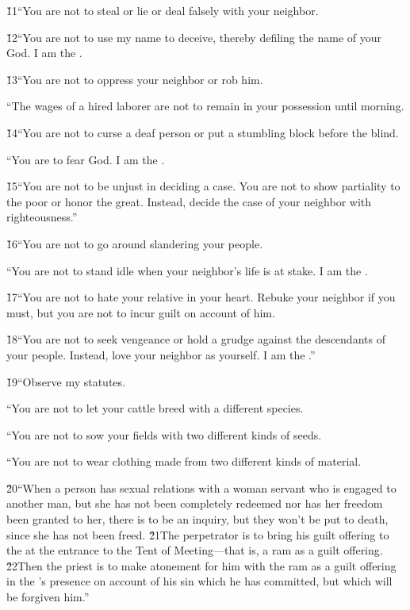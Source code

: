 \v{11}``You are not to steal or lie or deal falsely with your neighbor.

\v{12}``You are not to use my name to deceive, thereby defiling the name of your God. I am the .

\v{13}``You are not to oppress your neighbor or rob him.

``The wages of a hired laborer are not to remain in your possession until morning.

\v{14}``You are not to curse a deaf person or put a stumbling block before the blind.

``You are to fear God. I am the .

\v{15}``You are not to be unjust in deciding a case. You are not to show partiality to the poor or honor the great. Instead, decide the case of your neighbor with righteousness.''

\v{16}``You are not to go around slandering your people.

``You are not to stand idle when your neighbor's life is at stake. I am the .

\v{17}``You are not to hate your relative in your heart. Rebuke your neighbor if you must, but you are not to incur guilt on account of him.

\v{18}``You are not to seek vengeance or hold a grudge against the descendants of your people. Instead, love your neighbor as yourself. I am the .''

\v{19}``Observe my statutes.

``You are not to let your cattle breed with a different species.

``You are not to sow your fields with two different kinds of seeds.

``You are not to wear clothing made from two different kinds of material.

\v{20}``When a person has sexual relations with a woman servant who is engaged to another man, but she has not been completely redeemed nor has her freedom been granted to her, there is to be an inquiry, but they won't be put to death, since she has not been freed. \v{21}The perpetrator is to bring his guilt offering to the  at the entrance to the Tent of Meeting---that is, a ram as a guilt offering. \v{22}Then the priest is to make atonement for him with the ram as a guilt offering in the 's presence on account of his sin which he has committed, but which will be forgiven him.''

